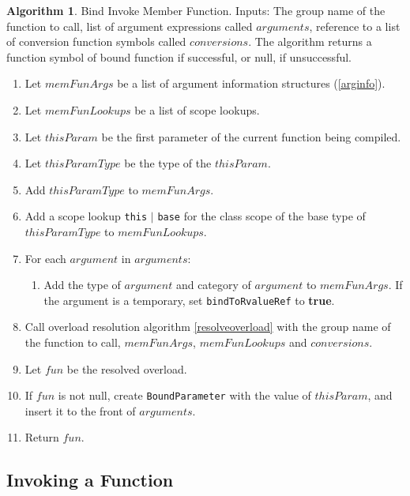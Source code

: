 \documentclass[a4paper,oneside,11pt]{book}
\theoremstyle{definition}
\newtheorem{algo}{Algorithm}[section]
\begin{document}
\begin{algo}\label{bindinvokememfun} Bind Invoke Member Function.
Inputs: The group name of the function to call, list of argument expressions called $arguments$,
reference to a list of conversion function symbols called $conversions$.
The algorithm returns a function symbol of bound function if successful, or null, if unsuccessful.
\begin{enumerate}
\item
Let $memFunArgs$ be a list of argument information structures (\ref{arginfo}).
\item
Let $memFunLookups$ be a list of scope lookups.
\item
Let $thisParam$ be the first parameter of the current function being compiled.
\item
Let $thisParamType$ be the type of the $thisParam$.
\item
Add $thisParamType$ to $memFunArgs$.
\item
Add a scope lookup \verb|this| $|$ \verb|base| for the class scope of the base type of $thisParamType$ to $memFunLookups$.
\item
For each $argument$ in $arguments$:
\begin{enumerate}
\item
Add the type of $argument$ and category of $argument$ to $memFunArgs$. If the argument is a temporary, set \verb|bindToRvalueRef| to \textbf{true}.
\end{enumerate}
\item
Call overload resolution algorithm \ref{resolveoverload} with the group name of the function to call, $memFunArgs$, $memFunLookups$ and $conversions$.
\item
Let $fun$ be the resolved overload.
\item
If $fun$ is not null, create \verb|BoundParameter| with the value of $thisParam$, and insert it to the front of $arguments$.
\item
Return $fun$.
\end{enumerate}
\end{algo}

\subsection{Invoking a Function}
\end{document}
